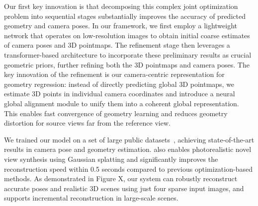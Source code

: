 Our first key innovation is that decomposing this complex joint optimization problem into sequential stages substantially improves the accuracy of predicted geometry and camera poses. In our framework, we first employ a lightweight network that operates on low-resolution images to obtain initial coarse estimates of camera poses and 3D pointmaps. The refinement stage then leverages a transformer-based architecture to incorporate these preliminary results as crucial geometric priors, further refining both the 3D pointmaps and camera poses. The key innovation of the refinement is our camera-centric representation for geometry regression: instead of directly predicting global 3D pointmaps, we estimate 3D points in individual camera coordinates and introduce a neural global alignment module to unify them into a coherent global representation. This enables fast convergence of geometry learning and reduces geometry distortion for source views far from the reference view.



% 
%

%






We trained our model on a set of  large public datasets~\citep{},  achieving state-of-the-art results in  camera pose and geometry estimation. \method also enables photorealistic novel view synthesis using Gaussian splatting and significantly improves the reconstruction speed within 0.5 seconds compared to previous optimization-based methods. 
As demonstrated in Figure X, our system can robustly reconstruct accurate poses and realistic 3D scenes using just four sparse input images, and supports incremental reconstruction in large-scale scenes.



